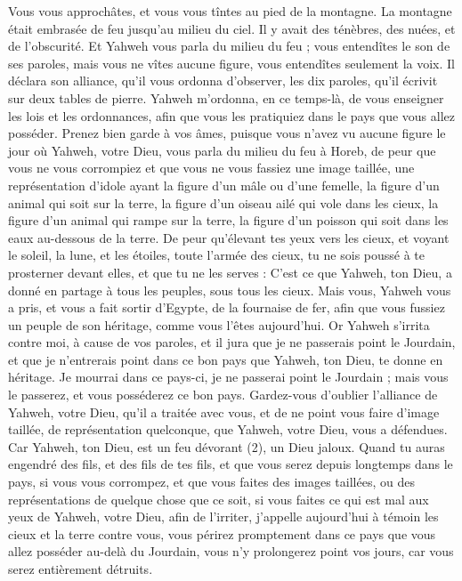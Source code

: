 \begin{multicols}{2}
Vous vous approchâtes, et vous vous tîntes au pied de la montagne. La montagne était embrasée de feu jusqu'au milieu du ciel. Il y avait des ténèbres, des nuées, et de l’obscurité.
Et Yahweh vous parla du milieu du feu ; vous entendîtes le son de ses paroles, mais vous ne vîtes aucune figure, vous entendîtes seulement la voix.
Il déclara son alliance, qu’il vous ordonna d'observer, les dix paroles, qu'il écrivit sur deux tables de pierre.
Yahweh m’ordonna, en ce temps-là, de vous enseigner les lois et les ordonnances, afin que vous les pratiquiez dans le pays que vous allez posséder.
Prenez bien garde à vos âmes, puisque vous n'avez vu aucune figure le jour où Yahweh, votre Dieu, vous parla du milieu du feu à Horeb,
de peur que vous ne vous corrompiez et que vous ne vous fassiez une image taillée, une représentation d’idole ayant la figure d'un mâle ou d'une femelle,
la figure d’un animal qui soit sur la terre, la figure d'un oiseau ailé qui vole dans les cieux,
la figure d’un animal qui rampe sur la terre, la figure d’un poisson qui soit dans les eaux au-dessous de la terre.
De peur qu’élevant tes yeux vers les cieux, et voyant le soleil, la lune, et les étoiles, toute l'armée des cieux, tu ne sois poussé à te prosterner devant elles, et que tu ne les serves : C’est ce que Yahweh, ton Dieu, a donné en partage à tous les peuples, sous tous les cieux.
Mais vous, Yahweh vous a pris, et vous a fait sortir d'Egypte, de la fournaise de fer, afin que vous fussiez un peuple de son héritage, comme vous l’êtes aujourd'hui.
Or Yahweh s’irrita contre moi, à cause de vos paroles, et il jura que je ne passerais point le Jourdain, et que je n'entrerais point dans ce bon pays que Yahweh, ton Dieu, te donne en héritage.
Je mourrai dans ce pays-ci, je ne passerai point le Jourdain ; mais vous le passerez, et vous posséderez ce bon pays.
Gardez-vous d’oublier l'alliance de Yahweh, votre Dieu, qu’il a traitée avec vous, et de ne point vous faire d’image taillée, de représentation quelconque, que Yahweh, votre Dieu, vous a défendues.
Car Yahweh, ton Dieu, est un feu dévorant (2), un Dieu jaloux.
Quand tu auras engendré des fils, et des fils de tes fils, et que vous serez depuis longtemps dans le pays, si vous vous corrompez, et que vous faites des images taillées, ou des représentations de quelque chose que ce soit, si vous faites ce qui est mal aux yeux de Yahweh, votre Dieu, afin de l'irriter,
j'appelle aujourd'hui à témoin les cieux et la terre contre vous, vous périrez promptement dans ce pays que vous allez posséder au-delà du Jourdain, vous n'y prolongerez point vos jours, car vous serez entièrement détruits.

\end{multicols}
